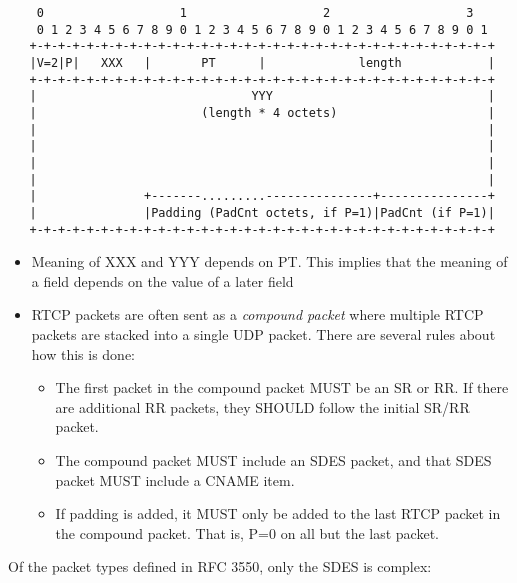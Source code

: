\documentclass[10pt,a4paper]{article}
\begin{document}
\footnotesize
\begin{verbatim}
    0                   1                   2                   3
    0 1 2 3 4 5 6 7 8 9 0 1 2 3 4 5 6 7 8 9 0 1 2 3 4 5 6 7 8 9 0 1
   +-+-+-+-+-+-+-+-+-+-+-+-+-+-+-+-+-+-+-+-+-+-+-+-+-+-+-+-+-+-+-+-+
   |V=2|P|   XXX   |       PT      |             length            |
   +-+-+-+-+-+-+-+-+-+-+-+-+-+-+-+-+-+-+-+-+-+-+-+-+-+-+-+-+-+-+-+-+
   |                              YYY                              |
   |                       (length * 4 octets)                     |
   |                                                               |
   |                                                               |
   |                                                               |
   |                                                               |
   |               +-------.........---------------+---------------+
   |               |Padding (PadCnt octets, if P=1)|PadCnt (if P=1)|
   +-+-+-+-+-+-+-+-+-+-+-+-+-+-+-+-+-+-+-+-+-+-+-+-+-+-+-+-+-+-+-+-+
\end{verbatim}
\normalsize

\begin{itemize}
  \item  Meaning of XXX and YYY depends on PT. This implies that the
    meaning of a field depends on the value of a later field
  \item RTCP packets are often sent as a \emph{compound packet} where
    multiple RTCP packets are stacked into a single UDP packet. There
    are several rules about how this is done:
    \begin{itemize}
      \item The first packet in the compound packet MUST be an SR or RR.
        If there are additional RR packets, they SHOULD follow the initial
        SR/RR packet.
      \item The compound packet MUST include an SDES packet, and that SDES 
        packet MUST include a CNAME item.
      \item If padding is added, it MUST only be added to the last RTCP
        packet in the compound packet. That is, P=0 on all but the last
        packet. 
    \end{itemize}
\end{itemize}

Of the packet types defined in RFC 3550, only the SDES is complex:
\end{document}
